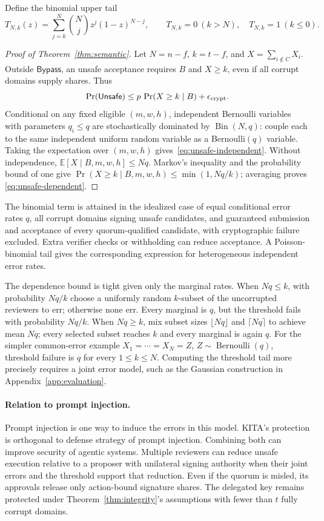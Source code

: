 \documentclass{article}
\begin{document}
Define the binomial upper tail
\[
 T_{N,k}(z)=\sum_{j=k}^{N}\binom Nj z^j(1-z)^{N-j},
 \qquad T_{N,k}=0\ (k>N),\quad T_{N,k}=1\ (k\le0).
\]

\begin{proof}[Proof of Theorem~\ref{thm:semantic}]
Let $N=n-f$, $k=t-f$, and $X=\sum_{i\notin C}X_i$.
Outside $\mathsf{Bypass}$, an unsafe acceptance requires $B$ and $X\ge k$,
even if all corrupt domains supply shares. Thus
\[
 \Pr(\mathsf{Unsafe})\le
 p\,\Pr(X\ge k\mid B)+\epsilon_{\rm crypt}.
\]
Conditional on any fixed eligible $(m,w,h)$, independent Bernoulli variables
with parameters $q_i\le q$ are stochastically dominated by
$\operatorname{Bin}(N,q)$: couple each to the same independent uniform random
variable as a Bernoulli$(q)$ variable. Taking the expectation over $(m,w,h)$
gives~\eqref{eq:unsafe-independent}.
Without independence, $\mathbb E[X\mid B,m,w,h]\le Nq$.
Markov's inequality and the probability bound of one give
$\Pr(X\ge k\mid B,m,w,h)\le\min(1,Nq/k)$; averaging proves
\eqref{eq:unsafe-dependent}.
\end{proof}

The binomial term is attained in the idealized case of equal conditional
error rates $q$, all corrupt domains signing unsafe candidates, and guaranteed
submission and acceptance of every quorum-qualified candidate, with
cryptographic failure excluded. Extra verifier checks or withholding can
reduce acceptance. A Poisson-binomial tail gives the corresponding expression
for heterogeneous independent error rates.

The dependence bound is tight given only the marginal rates.
When $Nq\le k$, with probability $Nq/k$ choose a uniformly random $k$-subset
of the uncorrupted reviewers to err; otherwise none err. Every marginal is
$q$, but the threshold fails with probability $Nq/k$. When $Nq\ge k$,
mix subset sizes $\lfloor Nq\rfloor$ and $\lceil Nq\rceil$ to achieve mean
$Nq$; every selected subset reaches $k$ and every marginal is again $q$.
For the simpler common-error example $X_1=\cdots=X_N=Z$,
$Z\sim\operatorname{Bernoulli}(q)$, threshold failure is $q$ for every
$1\le k\le N$. Computing the threshold tail more precisely requires a joint
error model, such as the Gaussian construction in Appendix~\ref{app:evaluation}.

\paragraph{Relation to prompt injection.}
Prompt injection is one way to induce the errors in this model. \textsf{KITA}'s protection is orthogonal to defense strategy of prompt injection.
Combining both can improve security of agentic systems.
Multiple reviewers can reduce unsafe execution relative to a proposer with
unilateral signing authority when their joint errors and the threshold
support that reduction. Even if the quorum is misled, its approvals release
only action-bound signature shares. The delegated key remains protected
under Theorem~\ref{thm:integrity}'s assumptions with fewer than $t$ fully
corrupt domains.
\end{document}
